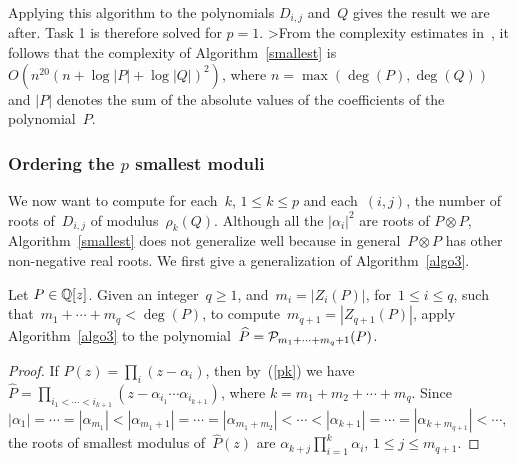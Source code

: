 Applying this algorithm to the polynomials $D_{i,j}$ and~$Q$ gives the
result we are after. Task 1 is therefore solved for $p=1$. 
>From the complexity estimates in~\cite{RoSz88}, it follows that
the complexity of Algorithm~\ref{smallest}
is~$O(n^{20}(n+\log|P|+\log|Q|)^2)$, where $n = \max(\deg(P), \deg(Q))$
and
$|P|$ denotes the sum of the absolute values of the coefficients
of the polynomial~$P$.

\subsubsection{Ordering the $p$ smallest moduli}
\label{2.1.2}

We now want to compute for each~$k$, $1\le k\le p$ and each~$(i,j)$,
the number of roots of~$D_{i,j}$ of modulus~$\rho_k(Q)$.
Although all the
$|\alpha_i|^2$ are roots of $P\otimes P$, Algorithm~\ref{smallest}
does not generalize well because in
general~$P\otimes P$  has other non-negative real roots.
We first give a generalization of Algorithm~\ref{algo3}.

\begin{alg}\label{algo4}
Let $P \in {\Bbb Q}[z]$. Given an integer~$q\ge1$, and~$m_i=|Z_i(P)|$,
for~$1\le i\le q$, such that~$m_1+\cdots+m_q<\deg(P)$, 
 to compute~$m_{q+1}=|Z_{q+1}(P)|$, apply Algorithm~\ref{algo3} to the
polynomial~$\widehat{P}={\cal P}_{m_1+\cdots+m_q+1}(P)$.
\end{alg}
\begin{proof}
If $P(z)=\prod_i (z-\alpha_i)$, then by~(\ref{pk}) we have
$\widehat{P}=\prod_{i_1<\cdots<i_{k+1}}(z-\alpha_{i_1}\cdots\alpha_{i_{k+1}})$,
where $k=m_1+m_2+\cdots+m_q$. Since~$|\alpha_1|=\cdots=|\alpha_{m_1}|<
|\alpha_{m_1+1}|=\cdots=|\alpha_{m_1+m_2}|< \cdots
<|\alpha_{k+1}|=\cdots=|\alpha_{k+m_{q+1}}| < \cdots$,
the roots of smallest modulus of~$\widehat{P}(z)$ 
are
$\alpha_{k+j}\prod_{i=1}^k \alpha_i$, $1 \leq j \leq
m_{q+1}$.
\end{proof}

